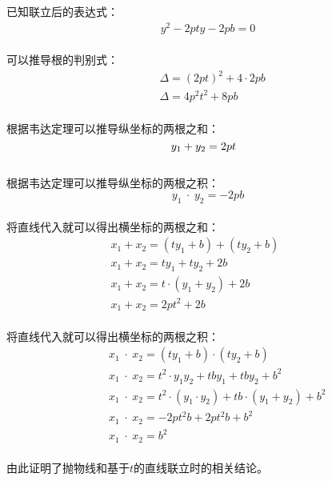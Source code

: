 \documentclass[UTF8]{ctexart}
\begin{document}
    已知联立后的表达式：
    \begin{align}
        y^2-2pty-2pb=0
    \end{align}\\
    可以推导根的判别式：
    \begin{align}
        &\Delta=(2pt)^2+4\cdot 2pb\\[3mm]
        &\Delta=4p^2t^2+8pb
    \end{align}\\
    根据韦达定理可以推导纵坐标的两根之和：
    \begin{equation}
        y_1+y_2=2pt\hphantom{-}
    \end{equation}\\
    根据韦达定理可以推导纵坐标的两根之积：
    \begin{equation}
        y_1\hspace{3pt}\cdot\hspace{3pt}y_2=-2pb
    \end{equation}\\
    将直线代入就可以得出横坐标的两根之和：\vspace{3pt}
    \begin{align}
        &x_1+x_2=(ty_1+b)+(ty_2+b)~~~~~~~~~~~~~~\\[3mm]
        &x_1+x_2=ty_1+ty_2+2b\\[3mm]
        &x_1+x_2=t\cdot(y_1+y_2)+2b\\[3mm]
        &x_1+x_2=2pt^2+2b
    \end{align}\\
    将直线代入就可以得出横坐标的两根之积：\vspace{3pt}
    \begin{align}
        &~~~~x_1\hspace{3pt}\cdot\hspace{3pt}x_2=(ty_1+b)\cdot(ty_2+b)\\[3mm]
        &~~~~x_1\hspace{3pt}\cdot\hspace{3pt}x_2=t^2\cdot y_1y_2+tby_1+tby_2+b^2\\[3mm]
        &~~~~x_1\hspace{3pt}\cdot\hspace{3pt}x_2=t^2\cdot(y_1\cdot y_2)+tb\cdot(y_1+y_2)+b^2\\[3mm]
        &~~~~x_1\hspace{3pt}\cdot\hspace{3pt}x_2=-2pt^2b+2pt^2b+b^2\\[3mm]
        &~~~~x_1\hspace{3pt}\cdot\hspace{3pt}x_2=b^2
    \end{align}\\
    由此证明了抛物线和基于$t$的直线联立时的相关结论。
\end{document}
